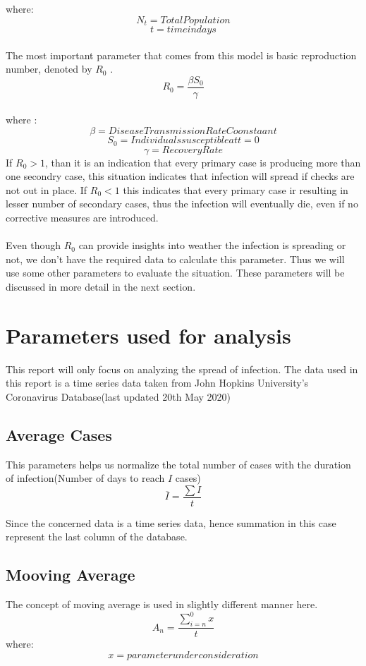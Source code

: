 \documentclass[12pt, twosided]{report}  %
\begin{document}
where:
$$ N_t = Total Population$$
$$ t = time in days $$
\\
The most important parameter that comes from this model is basic reproduction number, denoted by $R_0$ .
$$ R_0 = \frac{\beta S_0}{\gamma}$$
\\
where :
$$\beta = Disease Transmission Rate Coonstaant$$
$$ S_0 = Individuals susceptible at t= 0$$
$$ \gamma = Recovery Rate$$
If $R_0 > 1$, than it is an indication that every primary case is producing more than one secondry case, this situation indicates that infection will spread if checks are not out in place. If $R_0 < 1$ this indicates that every primary case ir resulting in lesser number of secondary cases, thus the infection will eventually die, even if no corrective measures are introduced.
\\
\\
Even though $R_0$ can provide insights into weather the infection is spreading or not, we don't have the required data to calculate this parameter. Thus we will use some other parameters to evaluate the situation. These parameters will be discussed in more detail in the next section.

\section{Parameters used for analysis}
This report will only focus on analyzing the spread of infection. The data used in this report is a time series data taken from John Hopkins University's Coronavirus Database(last updated 20th May 2020)

\subsection*{Average Cases}
This parameters helps us normalize the total number of cases with the duration of infection(Number of days to reach $I$ cases)
$$ \overline{I} = \frac{\sum I}{t} $$

Since the concerned data is a time series data, hence summation in this case represent the last column of the database.

\subsection*{Mooving Average}
The concept of moving average is used in slightly different manner here.
$$\displaystyle A_n = \frac{\sum_{i=n} ^{0} {x}}{t}$$
where:
$$ x = parameter under consideration$$
\end{document}
